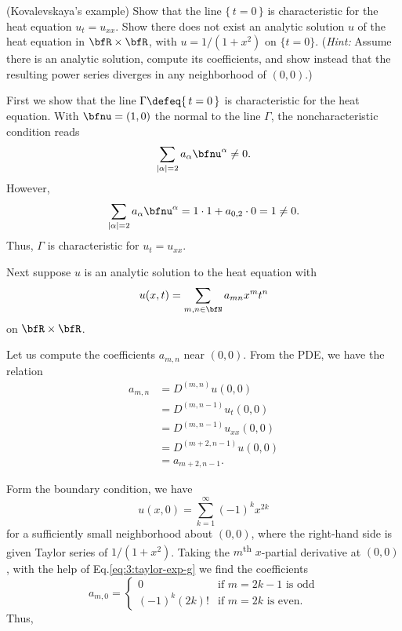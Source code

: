 \begin{problem}
  (Kovalevskaya's example) Show that the line \(\{\,t=0\,\}\) is
  characteristic for the heat equation \(u_t=u_{xx}\). Show there does not
  exist an analytic solution \(u\) of the heat equation in
  \(\bfR\times\bfR\), with \(u=1/(1+x^2)\) on \(\{t=0\}\). (\emph{Hint:}
  Assume there is an analytic solution, compute its coefficients, and show
  instead that the resulting power series diverges in any neighborhood of
  \((0,0)\).)
\end{problem}
\begin{solution}
  First we show that the line \(\Gamma\defeq\{\,t=0\,\}\) is characteristic
  for the heat equation. With \(\bfnu=(1,0)\) the normal to the line
  \(\Gamma\), the noncharacteristic condition reads
  \[
    \sum_{|\alpha|=2} a_\alpha\bfnu^\alpha\neq 0.
  \]
  However,
  \[
    \sum_{|\alpha|=2} a_\alpha\bfnu^\alpha=%
    1\cdot 1+a_{0,2}\cdot 0=%
    1\neq%
    0.
  \]
  Thus, \(\Gamma\) is characteristic for \(u_t=u_{xx}\).

  Next suppose \(u\) is an analytic solution to the heat equation with
  \[
    u(x,t)=\sum_{m,n\in\bfN} a_{mn}x^mt^n
  \]
  on \(\bfR\times\bfR\).

  Let us compute the coefficients \(a_{m,n}\) near \((0,0)\). From the PDE,
  we have the relation
  \begin{equation}
    \label{eq:3:pde-relation}
    \begin{aligned}
      a_{m,n}
      &=D^{(m,n)} u(0,0)\\
      &=D^{(m,n-1)}u_t(0,0)\\
      &=D^{(m,n-1)}u_{xx}(0,0)\\
      &=D^{(m+2,n-1)}u(0,0)\\
      &=a_{m+2,n-1}.
    \end{aligned}
  \end{equation}

  Form the boundary condition, we have
  \begin{equation}
    \label{eq:3:taylor-exp-g}
    u(x,0)=\sum_{k=1}^\infty (-1)^k x^{2k}
  \end{equation}
  for a sufficiently small neighborhood about \((0,0)\), where the
  right-hand side is given Taylor series of \(1/(1+x^2)\). Taking the
  \(m\)\textsuperscript{th} \(x\)-partial derivative at \((0,0)\), with the
  help of Eq.\@ \eqref{eq:3:taylor-exp-g} we find the coefficients
  \begin{equation}
    \label{eq:3:boundary-relation}
    a_{m,0}=
    \begin{cases}
      0&\text{if \(m=2k-1\) is odd}\\
      (-1)^k(2k)!&\text{if \(m=2k\) is even.}
    \end{cases}
  \end{equation}
  Thus,
\end{solution}

